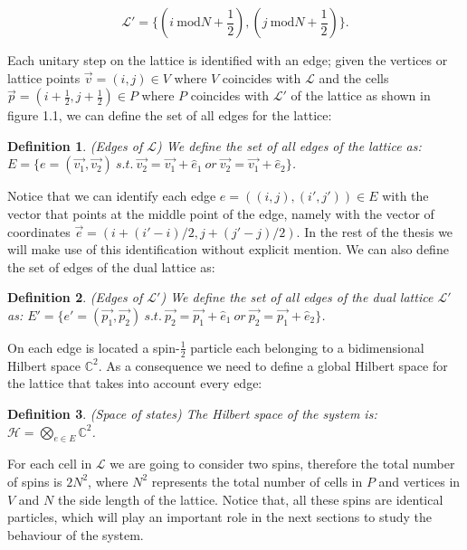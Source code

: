 \documentclass{Configuration_Files/PoliMi3i_thesis}
\newtheorem{definition}{Definition}[chapter]
\begin{document}
\[
  \mathcal{L}' = \{ (i \ \mathrm{mod}N +\frac{1}{2}), (j \ \mathrm{mod}N +\frac{1}{2})\}.
\]

Each unitary step on the lattice is identified with an edge; given the vertices or lattice points $\vec{v}=(i,j) \in V$ where $V$ coincides with $\mathcal{L}$ and the cells $\vec{p}=(i+\frac{1}{2},j+\frac{1}{2})\in P$ where $P$ coincides with $ \mathcal{L'}$ of the lattice as shown in figure 1.1, we can define the set of all edges for the lattice:

\begin{definition}(Edges of $\mathcal{L}$)
	We define the set of all edges of the lattice as: $E = \{e=(\vec{v_1},\vec{v_2}) \ s.t. \ \vec{v_2}=\vec{v_1}+\hat{e}_1 \ or \ \vec{v_2}=\vec{v_1}+\hat{e}_2 \}$.
\end{definition}

Notice that we can identify each edge $e=((i,j),(i',j')) \in E$ with the vector that points at the middle point of the edge, namely with the vector of coordinates $\vec{e}=(i + (i'-i)/2, j + (j'-j)/2)$. In the rest of the thesis we will make use of this identification without explicit mention. We can also define the set of edges of the dual lattice as:

\begin{definition}(Edges of $\mathcal{L'}$)
	We define the set of all edges of the dual lattice $\mathcal{L'}$ as: $E' = \{e'=(\vec{p_1},\vec{p_2}) \ s.t. \ \vec{p_2}=\vec{p_1}+\hat{e}_1 \ or \ \vec{p_2}=\vec{p_1}+\hat{e}_2 \}$.
\end{definition}

On each edge is located a spin-$\frac{1}{2}$ particle each belonging to a bidimensional Hilbert space $\mathbb{C}^2$. As a consequence we need to define a global Hilbert space for the lattice that takes into account every edge:

\begin{definition}(Space of states)
	The Hilbert space of the system is: $\mathscr{H}= \bigotimes_{e \in E} \mathbb{C}^2$.
\end{definition}

For each cell in $\mathcal{L}$ we are going to consider two spins, therefore the total number of spins is $2N^2$, where $N^2$ represents the total number of cells in $P$ and vertices in $V$ and $N$ the side length of the lattice. Notice that, all these spins are identical particles, which will play an important role in the next sections to study the behaviour of the system.
\end{document}
